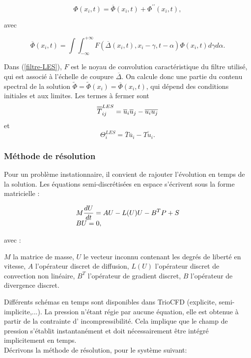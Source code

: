 \begin{equation}
\Phi (x_i,t)=\overline \Phi (x_i,t)  + \Phi ^{\prime\prime} (x_i,t),
\end{equation}

avec

\begin{equation}
\label{filtre-LES}
\overline{\Phi}(x_i,t) = \int \int _{-\infty}^{+\infty}F\left(\overline \Delta (x_i,t),x_i-\gamma , t-\alpha  \right)\Phi(x_i,t)d\gamma d\alpha .
\end{equation}

Dans (\ref{filtre-LES}), $F$ est le noyau de convolution caract\'eristique du filtre utilis\'e, qui est associ\'e \`a l'\'echelle de coupure $\overline \Delta$.
On calcule donc une partie du contenu spectral  de la solution $ \widetilde \Phi=\widetilde \Phi (x_i) =\overline{\Phi}(x_i,t)$, qui d\'epend des conditions initiales et aux limites. Les termes \`a fermer sont $$\dbar T ^{LES}_{ij}=\overline u_i\overline u_j-\overline{u_i u_j} $$ et $$ \Theta ^{LES}_i=\overline T \overline u_i-\overline{Tu_i}. $$


\subsubsection{M\'ethode de r\'esolution}
\label{Trio-r\'esolution}
Pour un probl\`eme instationnaire, il convient de rajouter l'\'evolution en temps de la solution. Les \'equations semi-discr\'etis\'ees en espace s'\'ecrivent sous la forme matricielle :

\begin{equation}
\label{Sys-a-inverser}
\begin{array}{l}
\ds{
M\frac{dU}{dt}=AU-L(U)U-B^T P+S}\\
\ds{BU=0},
\end{array}
\end{equation}

avec :

\begin{itemize}
\itemb
$M$ la matrice de masse,
\itemb
$U$ le vecteur inconnu contenant les degr\'es de libert\'e en vitesse,
\itemb
$A$ l'op\'erateur discret de diffusion,
\itemb
$L(U)$ l'op\'erateur discret de convection non lin\'eaire,
\itemb
$B^T$ l'op\'erateur de gradient discret,
\itemb
$B$ l'op\'erateur de divergence discret.
\end{itemize}

Diff\'erents sch\'emas en temps sont disponibles dans TrioCFD (explicite, semi-implicite,...). La pression n'\'etant r\'egie par aucune \'equation, elle est obtenue \`a
partir de la contrainte d' incompressibilit\'e. Cela implique que le champ de pression s'\'etablit instantan\'ement et doit n\'ecessairement \^etre int\'egr\'e implicitement en temps.\\
D\'ecrivons la m\'ethode de r\'esolution, pour le syst\`eme suivant:

